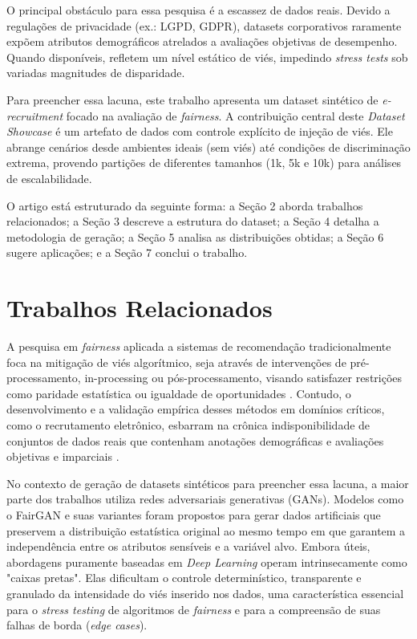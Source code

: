 \documentclass[12pt]{article}
\begin{document}
O principal obstáculo para essa pesquisa é a escassez de dados reais. Devido a regulações de privacidade (ex.: LGPD, GDPR), datasets corporativos raramente expõem atributos demográficos atrelados a avaliações objetivas de desempenho. Quando disponíveis, refletem um nível estático de viés, impedindo \textit{stress tests} sob variadas magnitudes de disparidade.

Para preencher essa lacuna, este trabalho apresenta um dataset sintético de \textit{e-recruitment} focado na avaliação de \textit{fairness}. A contribuição central deste \textit{Dataset Showcase} é um artefato de dados com controle explícito de injeção de viés. Ele abrange cenários desde ambientes ideais (sem viés) até condições de discriminação extrema, provendo partições de diferentes tamanhos (1k, 5k e 10k) para análises de escalabilidade.

O artigo está estruturado da seguinte forma: a Seção 2 aborda trabalhos relacionados; a Seção 3 descreve a estrutura do dataset; a Seção 4 detalha a metodologia de geração; a Seção 5 analisa as distribuições obtidas; a Seção 6 sugere aplicações; e a Seção 7 conclui o trabalho.

\section{Trabalhos Relacionados}

A pesquisa em \textit{fairness} aplicada a sistemas de recomendação tradicionalmente foca na mitigação de viés algorítmico, seja através de intervenções de pré-processamento, in-processing ou pós-processamento, visando satisfazer restrições como paridade estatística ou igualdade de oportunidades \cite{mehrabi2021survey}. Contudo, o desenvolvimento e a validação empírica desses métodos em domínios críticos, como o recrutamento eletrônico, esbarram na crônica indisponibilidade de conjuntos de dados reais que contenham anotações demográficas e avaliações objetivas e imparciais \cite{cowgill2020bias}.

No contexto de geração de datasets sintéticos para preencher essa lacuna, a maior parte dos trabalhos utiliza redes adversariais generativas (GANs). Modelos como o FairGAN \cite{xu2018fairgan} e suas variantes \cite{choi2020fair} foram propostos para gerar dados artificiais que preservem a distribuição estatística original ao mesmo tempo em que garantem a independência entre os atributos sensíveis e a variável alvo. Embora úteis, abordagens puramente baseadas em \textit{Deep Learning} operam intrinsecamente como "caixas pretas". Elas dificultam o controle determinístico, transparente e granulado da intensidade do viés inserido nos dados, uma característica essencial para o \textit{stress testing} de algoritmos de \textit{fairness} e para a compreensão de suas falhas de borda (\textit{edge cases}).
\end{document}
